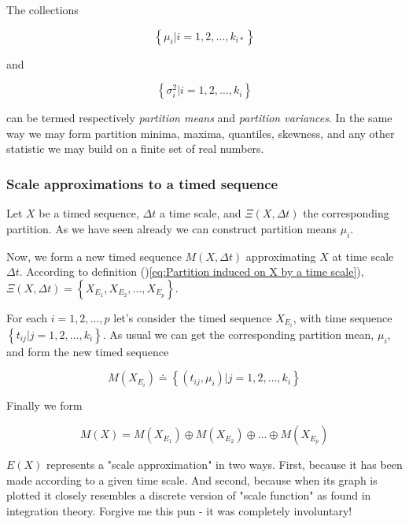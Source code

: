 \documentclass[a4paper,10pt]{book}
\begin{document}
The collections

\begin{equation}\label{eq:Partition mean}
	\left\{\mu_{i} \left| i=1, 2, \ldots, k_{i*} \right.\right\}
\end{equation}

\noindent and

\begin{equation}\label{eq:Partition variance}
	\left\{\sigma_{i}^{2} \left| i=1, 2, \ldots, k_{i} \right.\right\}
\end{equation}

\noindent can be termed respectively \emph{partition means} and \emph{partition variances}. In the same way we may form partition minima, maxima, quantiles, skewness, and any other statistic we may build on a finite set of real numbers.


\subsubsection{Scale approximations to a timed sequence}

Let $X$ be a timed sequence, $\Delta t$ a time scale, and $\Xi(X,\Delta t)$ the corresponding partition. As we have seen already we can construct partition means $\mu_{i}$.

Now, we form a new timed sequence $M(X,\Delta t)$ approximating $X$ at time scale $\Delta t$. According to definition ()\ref{eq:Partition induced on X by a time scale}), $\Xi(X,\Delta t) = \left\{X_{E_{1}}, X_{E_{2}}, \ldots, X_{E_{p}}\right\}$.

For each $i = 1, 2, \ldots, p$ let's consider the timed sequence $X_{E_{i}}$, with time sequence $\left\{t_{ij} \left| j = 1, 2, \ldots, k_{i}\right.\right\}$. As usual we can get the corresponding partition mean, $\mu_{i}$, and form the new timed sequence

\begin{equation}\label{eq:Timed sequence on a slice}
	M\left(X_{E_{i}}\right) \doteq \left\{(t_{ij},\mu_{i}) \left| j=1, 2, \ldots, k_{i} \right.\right\}
\end{equation}

\noindent Finally we form

\begin{equation}\label{eq:Scale approximation}
	M(X) = M\left(X_{E_{1}}\right) \oplus M\left(X_{E_{2}}\right) \oplus \ldots \oplus M\left(X_{E_{p}}\right)
\end{equation}

$E(X)$ represents a "scale approximation" in two ways. First, because it has been made according to a given time scale. And second, because when its graph is plotted it closely resembles a discrete version of "scale function" as found in integration theory. Forgive me this pun - it was completely involuntary!
\end{document}
